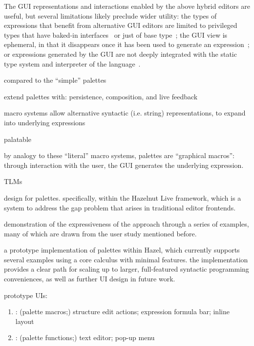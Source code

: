 The GUI representations and interactions enabled by the above hybrid editors are
useful, but several limitations likely preclude wider utility:
%
the types of expressions that benefit from alternative GUI editors are limited
to
%
privileged types that have baked-in interfaces~\citep{XXX}
%
or just of base type~\citep{XXX};
%
the GUI view is ephemeral, in that it disappears once it has been used to
generate an expression~\citep{XXX}; or
%
expressions generated by the GUI are not deeply integrated with the static type
system and interpreter of the language~\citep{XXX,XXX,XXX}.





compared to the ``simple'' palettes

extend palettes with: persistence, composition, and live feedback

macro systems allow alternative syntactic (i.e. string) representations, to
expand into underlying expressions

palatable

by analogy to these ``literal'' macro systems, palettes are ``graphical
macros'': through interaction with the user, the GUI generates the underlying
expression.

TLMs~\cite{TLMs}




design for palettes. specifically, within the Hazelnut Live framework,
which is a system to address the gap problem that arises in traditional editor
frontends.

demonstration of the expressiveness of the approach through a series of
examples, many of which are drawn from the user study mentioned before.

a prototype implementation of palettes within Hazel, which currently
supports several examples using a core calculus with minimal features. the
implementation provides a clear path for scaling up to larger, full-featured
syntactic programming conveniences, as well as further UI design in future work.

prototype UIs:

  \begin{enumerate}
    \item \Hazel{}: (palette macros;) structure edit actions; expression formula bar; inline layout
    \item \sns{}: (palette functions;) text editor; pop-up menu
  \end{enumerate}

